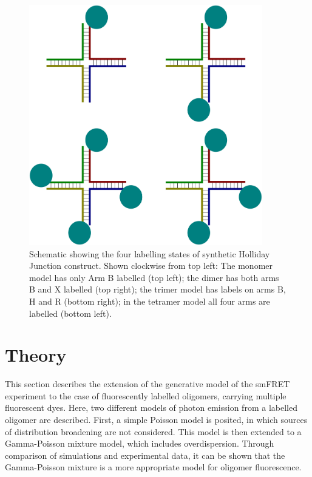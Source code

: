 \begin{figure}
   \begin{center}
      \includegraphics*[clip=true, width=4in]{sizing/holliday_junction_labelling.pdf}
      \caption{Schematic showing the four labelling states of synthetic Holliday Junction construct. Shown clockwise from top left: The monomer model has only Arm B labelled (top left); the dimer has both arms B and X labelled (top right); the trimer model has labels on arms B, H and R (bottom right); in the tetramer model all four arms are labelled (bottom left).}
      \label{fig:holliday_junction_labelling}
   \end{center}
\end{figure}

\section{Theory}

This section describes the extension of the generative model of the smFRET experiment to the case of fluorescently labelled oligomers, carrying multiple fluorescent dyes. Here, two different models of photon emission from a labelled oligomer are described. First, a simple Poisson model is posited, in which sources of distribution broadening are not considered. This model is then extended to a Gamma-Poisson mixture model, which includes overdispersion. Through comparison of simulations and experimental data, it can be shown that the Gamma-Poisson mixture is a more appropriate model for oligomer fluorescence.

